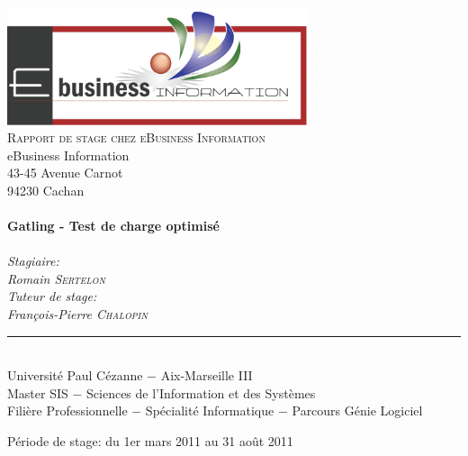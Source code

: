 \begin{titlepage}

\begin{center}

\includegraphics[width=250pt]{img/logo-ebiz.png}\\[2cm]

\textsc{\Large Rapport de stage chez eBusiness Information}\\[0.5cm]
eBusiness Information\\
43-45 Avenue Carnot\\
94230 Cachan\\[1cm]

\HRule \\[0.4cm]
{ \huge \bfseries Gatling - Test de charge optimisé}\\[0.4cm]

\HRule \\[2cm]

\em{Stagiaire:}\\
Romain \textsc{Sertelon}\\[0.4cm]

\em{Tuteur de stage:}\\
François-Pierre \textsc{Chalopin}\\[3cm]

\hrule \\[1cm]
Université Paul Cézanne $-$ Aix-Marseille III\\
Master SIS $-$ Sciences de l’Information et des Systèmes\\
Filière Professionnelle $-$ Spécialité Informatique $-$ Parcours Génie Logiciel\\[1.5cm]

\vfill

Période de stage: du 1er mars 2011 au 31 août 2011 

\end{center}

\end{titlepage}